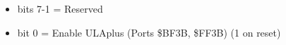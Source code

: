 \begin{itemize}
\item bits 7-1 = Reserved
\item bit 0 = Enable ULAplus (Ports \$BF3B, \$FF3B) (1 on reset)
\end{itemize}

